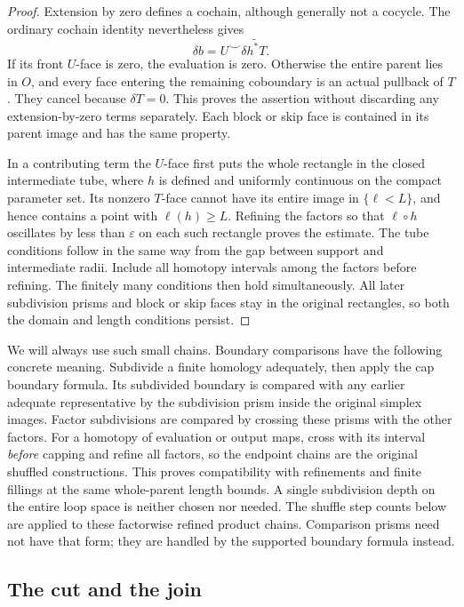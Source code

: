 \begin{proof}
Extension by zero defines a cochain, although generally not a
cocycle.  The ordinary cochain identity nevertheless gives
\[
 \delta b=U\smile\delta\widetilde{h^*T}.
\]
If its front $U$-face is zero, the evaluation is zero.  Otherwise the
entire parent lies in $O$, and every face entering the remaining
coboundary is an actual pullback of $T$.  They cancel because
$\delta T=0$.  This proves the assertion without discarding any
extension-by-zero terms separately.  Each block or skip face is
contained in its parent image and has the same property.

In a contributing term the $U$-face first puts the whole rectangle
in the closed intermediate tube, where $h$ is defined and uniformly
continuous on the compact parameter set.  Its nonzero $T$-face
cannot have its entire image in $\{\ell<L\}$, and hence contains
a point with $\ell(h)\ge L$.  Refining the factors so that
$\ell\circ h$ oscillates by less than $\varepsilon$ on each such
rectangle proves the estimate.  The tube conditions follow in the
same way from the gap between support and intermediate radii.
Include all homotopy intervals among the factors before refining.
The finitely many conditions then hold simultaneously.  All later
subdivision prisms and block or skip faces stay in the original
rectangles, so both the domain and length conditions persist.
\end{proof}

We will always use such small chains.  Boundary comparisons have the
following concrete meaning.  Subdivide a finite homology adequately,
then apply the cap boundary formula.  Its subdivided boundary is
compared with any earlier adequate representative by the subdivision
prism inside the original simplex images.  Factor subdivisions are
compared by crossing these prisms with the other factors.  For a
homotopy of evaluation or output maps, cross with its interval
\emph{before} capping and refine all factors, so the endpoint chains
are the original shuffled constructions.  This proves compatibility
with refinements and finite fillings at the same whole-parent length
bounds.  A single subdivision depth on the entire loop space is
neither chosen nor needed.
The shuffle step counts below are applied to these factorwise
refined product chains.  Comparison prisms need not have that
form; they are handled by the supported boundary formula instead.

\subsection{The cut and the join}

